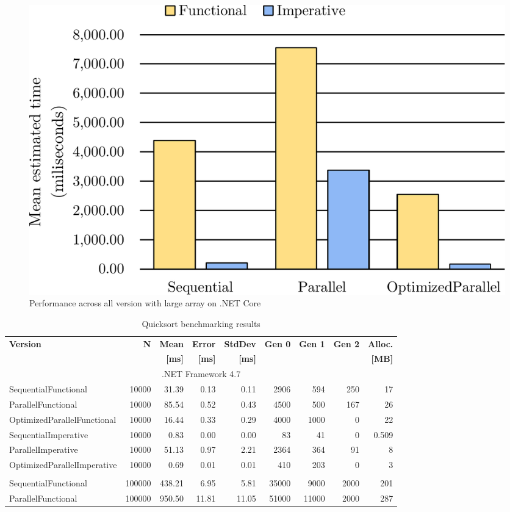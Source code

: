 \begin{figure}[htb]
\centering
\includegraphics[width=.62\linewidth]{figures04/FuncVsImp1000000.pdf}
\caption{Performance across all version with large array on .NET Core}
\label{fig:FuncVsImp1000000}
\end{figure}

\begin{table}\footnotesize
    \centering
    \caption{Quicksort benchmarking results}
		\label{tab:QuicksortBenchmarking}
    \begin{tabularx}{\linewidth}{Xrrrrrrrr} 
		  \toprule
			\toprule
			\bfseries Version 		&
			\bfseries N    	    	& 
			\bfseries Mean 	      &
			\bfseries Error       &
			\bfseries StdDev 	    &
			\bfseries Gen 0	    	&
			\bfseries Gen 1	    	&
			\bfseries Gen 2	    	&
			\bfseries Alloc.      \\ 
			&
			&
			\bfseries {[}ms{]} &
			\bfseries {[}ms{]} &
			\bfseries {[}ms{]} &
			&
			&
			&
			\bfseries{[}MB{]} \\			
			\midrule 
			\multicolumn{9}{c}{.NET Framework 4.7} \\ 
			\midrule 
SequentialFunctional	&	10000	&	31.39	&	0.13	&	0.11	&	2906	&	594	&	250	&	17	\\
ParallelFunctional	&	10000	&	85.54	&	0.52	&	0.43	&	4500	&	500	&	167	&	26	\\
OptimizedParallelFunctional	&	10000	&	16.44	&	0.33	&	0.29	&	4000	&	1000	&	0	&	22	\\
SequentialImperative	&	10000	&	0.83	&	0.00	&	0.00	&	83	&	41	&	0	&	0.509	\\
ParallelImperative	&	10000	&	51.13	&	0.97	&	2.21	&	2364	&	364	&	91	&	8	\\
OptimizedParallelImperative	&	10000	&	0.69	&	0.01	&	0.01	&	410	&	203	&	0	&	3	\\
&&&&&&&&\\
SequentialFunctional	&	100000	&	438.21	&	6.95	&	5.81	&	35000	&	9000	&	2000	&	201	\\
ParallelFunctional	&	100000	&	950.50	&	11.81	&	11.05	&	51000	&	11000	&	2000	&	287	\\

\end{tabularx}
\end{table}
